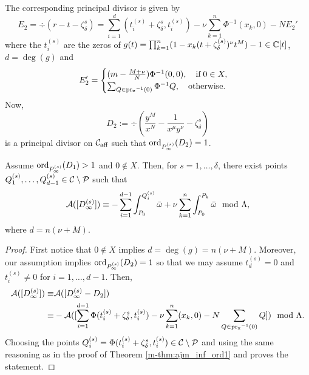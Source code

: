 \documentclass[main.tex]{subfiles}
\begin{document}
    The corresponding principal divisor is given by
     \begin{equation*}
      E_2 = \div(r - t - \zeta_{\delta}^s) = \sum_{i = 1}^{d} (t_i^{(s)}+\zeta_{\delta}^s,t_i^{(s)}) - \nu \sum_{k=1}^n
      \Phi^{-1}(x_k,0)- N E_2'
   \end{equation*}
      where the $t_i^{(s)}$ are the zeros of $g(t) = \prod_{k=1}^n (1-x_k(t+\zeta_{\delta}^{(s)})^{\nu}t^M) - 1 \in \mathbb{C}[t]$, $d = \deg(g)$ and
    \begin{equation}\label{eq:zero_bp2}
       E_2' = \begin{cases}
	   (m-\frac{M+\nu}{N}) \Phi^{-1}(0,0), \quad \text{if} \; 0 \in X, \\
             \sum_{Q \in \operatorname{pr_x}^{-1}(0)} \Phi^{-1}Q, \quad \text{otherwise.}
             \end{cases}
    \end{equation}
    Now,
    \begin{equation*}
     D_2 := \div \left( \frac{y^M}{x^N} - \frac{1}{x^{\mu}y^{\nu}} - \zeta_{\delta}^s \right)
    \end{equation*}
    is a principal divisor on $\mathcal{C}_{\text{aff}}$ such that
    $\operatorname{ord}_{P_{\infty}^{(s)}}(D_2) = 1$.

    \begin{thm}\label{thm:ajm_inf_ordgt1}
      Assume $\operatorname{ord}_{P_{\infty}^{(s)}}(D_1) > 1$ and $0 \not\in X$. Then, for $s = 1,\dots,\delta$, there exist points $Q_1^{(s)},\dots,Q_{d-1}^{(s)} \in \mathcal{C} \setminus \mathcal{P}$ such that
    \begin{equation*}%
       \AJ( [D_{\infty}^{(s)}] ) \equiv -\sum_{i = 1}^{d-1} \int_{P_0}^{Q_i^{(s)}} \bar\w + \nu \sum_{k=1}^n
      \int_{P_0}^{P_k} \bar\w \mod \Lambda,
    \end{equation*}
    where $d = n(\nu+M)$.
    \end{thm}
   \begin{proof}
    First notice that $0 \not\in X$ implies $d = \deg(g) = n(\nu+M)$. Moreover, our assumption implies $\operatorname{ord}_{P_{\infty}^{(s)}}(D_2) = 1$ so that we may assume
    $t_d^{(s)} = 0$ and $t_i^{(s)} \ne 0$ for $i=1,\dots,d-1$. 	Then,
    \begin{align*}
     \mathcal{A}( [D_{\infty}^{(s)}] ) \equiv & \mathcal{A}([D_{\infty}^{(s)} - D_2]) \\
      \equiv & -\mathcal{A}( [\sum_{i = 1}^{d-1} \Phi(t_i^{(s)}+\zeta_{\delta}^s,t_i^{(s)}) - \nu \sum_{k=1}^n
      (x_k,0) - N \sum_{Q \in \operatorname{pr_x}^{-1}(0)} Q ] )
       \mod \Lambda.
    \end{align*}
   Choosing the points
    $Q_i^{(s)} = \Phi(t_i^{(s)}+\zeta_{\delta}^s,t_i^{(s)}) \in \mathcal{C} \setminus \mathcal{P}$ and
     using the same reasoning as in the proof of Theorem \ref{m-thm:ajm_inf_ord1} and
    proves the statement.
     \end{proof}
\end{document}
